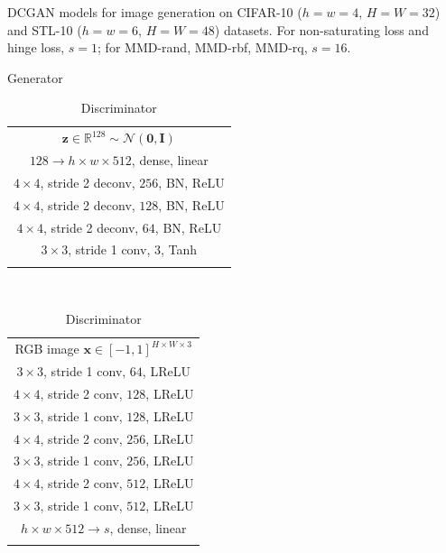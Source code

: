 \documentclass{article} %
\theoremstyle{plain}
\newtheorem*{proposition 1*}{Proposition 1}
\newcommand{\ds}[1]{\mathcal{#1}}  %
\newcommand{\set}[1]{\mathbb{#1}}  %
\def\toprule{\noalign{\smallskip\hrule height 1.2pt\smallskip}}
\def\midrule{\noalign{\smallskip\hrule\smallskip}}
\let\bottomrule=\toprule
\begin{document}
\begin{appendices}
\begin{table}[htb]
	\centering
	\caption{DCGAN models for image generation on CIFAR-10 (\(h=w=4\), \(H=W=32\)) and STL-10 (\(h=w=6\), \(H=W=48\)) datasets. For non-saturating loss and hinge loss, \(s=1\); for MMD-rand, MMD-rbf, MMD-rq, \(s=16\).}
	\label{Tab:architecture1}
	\begin{subtable}{0.45\textwidth}
		\centering
		\caption{Generator}
		\begin{tabular}{c}
			\toprule
			\(\bm{z}\in\set{R}^{128}\sim\ds{N}(\bm{0},\bm{I})\) \\
			\midrule
			\(128\to h\times w\times512\), dense, linear \\
			\midrule
			\(4\times4\), stride 2 deconv, \(256\), BN, ReLU\\
			\midrule
			\(4\times4\), stride 2 deconv, \(128\), BN, ReLU\\
			\midrule
			\(4\times4\), stride 2 deconv, \(64\), BN, ReLU\\
			\midrule
			\(3\times3\), stride 1 conv, \(3\), Tanh\\
			\bottomrule
		\end{tabular}
	\end{subtable}
	~
	\begin{subtable}{0.45\textwidth}
		\centering
		\caption{Discriminator}
		\begin{tabular}{c}
			\toprule
			RGB image \(\bm{x}\in[-1,1]^{H\times W\times3}\) \\
			\midrule
			\(3\times3\), stride 1 conv, \(64\), LReLU\\
			\midrule
			\(4\times4\), stride 2 conv, \(128\), LReLU\\
			\(3\times3\), stride 1 conv, \(128\), LReLU\\
			\midrule
			\(4\times4\), stride 2 conv, \(256\), LReLU\\
			\(3\times3\), stride 1 conv, \(256\), LReLU\\
			\midrule
			\(4\times4\), stride 2 conv, \(512\), LReLU\\
			\(3\times3\), stride 1 conv, \(512\), LReLU\\
			\midrule
			\(h\times w\times512\to s\), dense, linear\\
			\bottomrule
		\end{tabular}
	\end{subtable}
\end{table}


\end{appendices}
\end{document}

